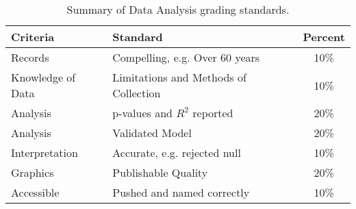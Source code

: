 \begin{table}[h]
\caption{Summary of Data Analysis grading standards.}
\label{tab:datagrading}
\begin{tabular}{llc}\hline
Criteria            &   Standard    & Percent \\ \hline\hline
Records  & Compelling, e.g. Over 60 years & 10\% \\
Knowledge of Data & Limitations and Methods of Collection & 10\% \\
Analysis & p-values and $R^2$ reported  & 20\% \\
Analysis          & Validated Model     & 20\% \\
Interpretation    & Accurate, e.g. rejected null   & 10\% \\
Graphics          & Publishable Quality & 20\% \\
Accessible        & Pushed and named correctly & 10\% \\
\hline
\end{tabular}
\end{table}